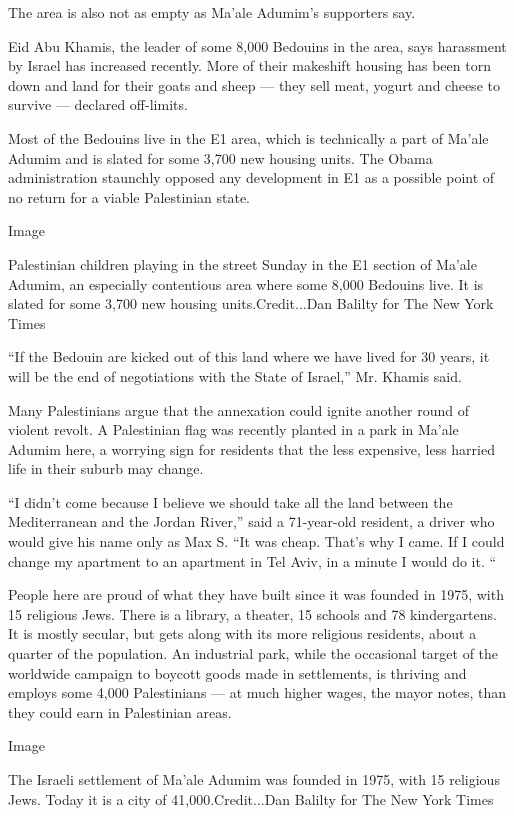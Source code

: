 The area is also not as empty as Ma'ale Adumim's supporters say.

Eid Abu Khamis, the leader of some 8,000 Bedouins in the area, says
harassment by Israel has increased recently. More of their makeshift
housing has been torn down and land for their goats and sheep --- they
sell meat, yogurt and cheese to survive --- declared off-limits.

Most of the Bedouins live in the E1 area, which is technically a part of
Ma'ale Adumim and is slated for some 3,700 new housing units. The Obama
administration staunchly opposed any development in E1 as a possible
point of no return for a viable Palestinian state.

Image

Palestinian children playing in the street Sunday in the E1 section of
Ma'ale Adumim, an especially contentious area where some 8,000 Bedouins
live. It is slated for some 3,700 new housing units.Credit...Dan Balilty
for The New York Times

``If the Bedouin are kicked out of this land where we have lived for 30
years, it will be the end of negotiations with the State of Israel,''
Mr. Khamis said.

Many Palestinians argue that the annexation could ignite another round
of violent revolt. A Palestinian flag was recently planted in a park in
Ma'ale Adumim here, a worrying sign for residents that the less
expensive, less harried life in their suburb may change.

``I didn't come because I believe we should take all the land between
the Mediterranean and the Jordan River,'' said a 71-year-old resident, a
driver who would give his name only as Max S. ``It was cheap. That's why
I came. If I could change my apartment to an apartment in Tel Aviv, in a
minute I would do it. ``

People here are proud of what they have built since it was founded in
1975, with 15 religious Jews. There is a library, a theater, 15 schools
and 78 kindergartens. It is mostly secular, but gets along with its more
religious residents, about a quarter of the population. An industrial
park, while the occasional target of the worldwide campaign to boycott
goods made in settlements, is thriving and employs some 4,000
Palestinians --- at much higher wages, the mayor notes, than they could
earn in Palestinian areas.

Image

The Israeli settlement of Ma'ale Adumim was founded in 1975, with 15
religious Jews. Today it is a city of 41,000.Credit...Dan Balilty for
The New York Times

